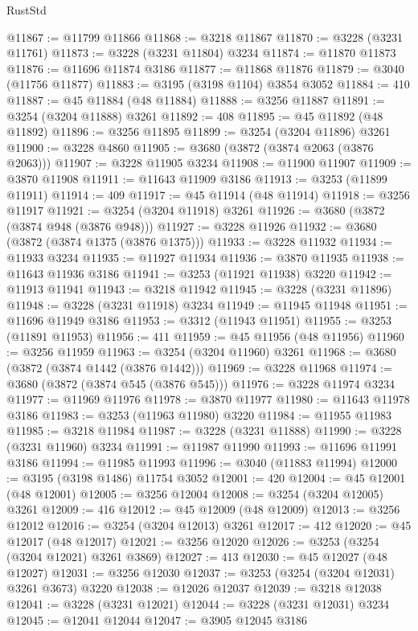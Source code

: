 \begin{lexlean}{RustStd}
\begin{coremodule}
{\begin{coremodule}
{{{{{{{{{{{{{{{{{{{{{{{{{{{{{{{{{{{{{@11867 := @11799 @11866
@11868 := @3218 @11867
@11870 := @3228 (@3231 @11761)
@11873 := @3228 (@3231 @11804) @3234
@11874 := @11870 @11873
@11876 := @11696 @11874 @3186
@11877 := @11868 @11876
@11879 := @3040 (@11756 @11877)
@11883 := @3195 (@3198 @1104) @3854 @3052
@11884 := 410
@11887 := @45 @11884 (@48 @11884)
@11888 := @3256 @11887
@11891 := @3254 (@3204 @11888) @3261
@11892 := 408
@11895 := @45 @11892 (@48 @11892)
@11896 := @3256 @11895
@11899 := @3254 (@3204 @11896) @3261
@11900 := @3228 @4860
@11905 := @3680 (@3872 (@3874 @2063 (@3876 @2063)))
@11907 := @3228 @11905 @3234
@11908 := @11900 @11907
@11909 := @3870 @11908
@11911 := @11643 @11909 @3186
@11913 := @3253 (@11899 @11911)
@11914 := 409
@11917 := @45 @11914 (@48 @11914)
@11918 := @3256 @11917
@11921 := @3254 (@3204 @11918) @3261
@11926 := @3680 (@3872 (@3874 @948 (@3876 @948)))
@11927 := @3228 @11926
@11932 := @3680 (@3872 (@3874 @1375 (@3876 @1375)))
@11933 := @3228 @11932
@11934 := @11933 @3234
@11935 := @11927 @11934
@11936 := @3870 @11935
@11938 := @11643 @11936 @3186
@11941 := @3253 (@11921 @11938) @3220
@11942 := @11913 @11941
@11943 := @3218 @11942
@11945 := @3228 (@3231 @11896)
@11948 := @3228 (@3231 @11918) @3234
@11949 := @11945 @11948
@11951 := @11696 @11949 @3186
@11953 := @3312 (@11943 @11951)
@11955 := @3253 (@11891 @11953)
@11956 := 411
@11959 := @45 @11956 (@48 @11956)
@11960 := @3256 @11959
@11963 := @3254 (@3204 @11960) @3261
@11968 := @3680 (@3872 (@3874 @1442 (@3876 @1442)))
@11969 := @3228 @11968
@11974 := @3680 (@3872 (@3874 @545 (@3876 @545)))
@11976 := @3228 @11974 @3234
@11977 := @11969 @11976
@11978 := @3870 @11977
@11980 := @11643 @11978 @3186
@11983 := @3253 (@11963 @11980) @3220
@11984 := @11955 @11983
@11985 := @3218 @11984
@11987 := @3228 (@3231 @11888)
@11990 := @3228 (@3231 @11960) @3234
@11991 := @11987 @11990
@11993 := @11696 @11991 @3186
@11994 := @11985 @11993
@11996 := @3040 (@11883 @11994)
@12000 := @3195 (@3198 @1486) @11754 @3052
@12001 := 420
@12004 := @45 @12001 (@48 @12001)
@12005 := @3256 @12004
@12008 := @3254 (@3204 @12005) @3261
@12009 := 416
@12012 := @45 @12009 (@48 @12009)
@12013 := @3256 @12012
@12016 := @3254 (@3204 @12013) @3261
@12017 := 412
@12020 := @45 @12017 (@48 @12017)
@12021 := @3256 @12020
@12026 := @3253 (@3254 (@3204 @12021) @3261 @3869)
@12027 := 413
@12030 := @45 @12027 (@48 @12027)
@12031 := @3256 @12030
@12037 := @3253 (@3254 (@3204 @12031) @3261 @3673) @3220
@12038 := @12026 @12037
@12039 := @3218 @12038
@12041 := @3228 (@3231 @12021)
@12044 := @3228 (@3231 @12031) @3234
@12045 := @12041 @12044
@12047 := @3905 @12045 @3186
}}}}}}}}}}}}}}}}}}}}}}}}}}}}}}}}}}}}}
\end{coremodule}}
\end{coremodule}
\end{lexlean}
